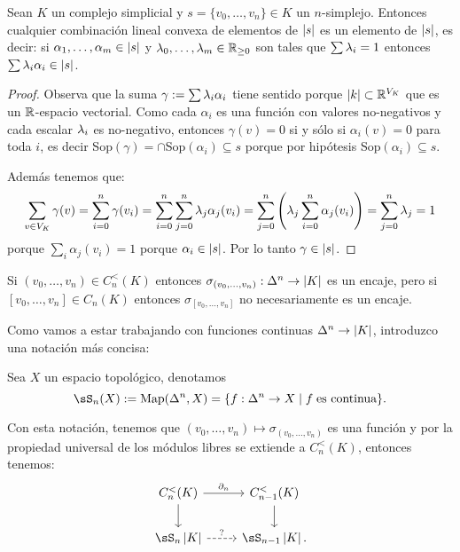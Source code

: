 \documentclass[../../topologia_algebraica]{subfiles}
\begin{document}
\begin{lema}
  Sean $K$ un complejo simplicial y $s=\{v_0,\ldots,v_n\}\in K$ un $n$-simplejo. Entonces cualquier
  combinaci\'on lineal convexa de elementos de $\left| s \right|$ es un elemento de $\left| s \right|$, es decir:
  si $\alpha_1,\ldots,\alpha_m\in\left| s \right|$ y $\lambda_0,\ldots,\lambda_m\in\mathbb{R}_{\geq 0}$ son tales que
  $\sum \lambda_i =1$ entonces $\sum \lambda_i\alpha_i \in\left| s \right|$.
\end{lema}
\begin{proof}
  Observa que la suma $\gamma:=\sum\lambda_i\alpha_i$ tiene sentido porque $\left| k \right|\subset\mathbb{R}^{V_K}$ que es
  un $\mathbb{R}$-espacio vectorial. Como cada $\alpha_i$ es una funci\'on con valores no-negativos y cada
  escalar $\lambda_i$ es no-negativo, entonces $\gamma(v)=0$ si y s\'olo si $\alpha_i(v)=0$ para toda $i$, es
  decir Sop$(\gamma)=\cap$Sop$(\alpha_i)\subseteq s$ porque por hip\'otesis Sop$(\alpha_i)\subseteq s$.
  
  Adem\'as tenemos que:
  \[
    \sum_{v\in V_K}\gamma(v)=
    \sum_{i=0}^n\gamma(v_i)=
    \sum_{i=0}^n\sum_{j=0}^n \lambda_j\alpha_j(v_i)=
    \sum_{j=0}^n\left( \lambda_j \sum_{i=0}^n \alpha_j( v_i) \right)=
    \sum_{j=0}^n \lambda_j =1
  \]
  porque $\sum_i \alpha_j(v_i)=1$ porque $\alpha_i\in\left| s \right|$. Por lo tanto $\gamma\in\left| s \right|$.
\end{proof}

\begin{nota}
  Si $(v_0,\ldots,v_n)\in C_n^<(K)$ entonces $\sigma_{(v_0,\ldots,v_n)}:\Delta^n\rightarrow\left| K \right|$ es un encaje,
  pero si $[v_0,\ldots,v_n]\in C_n(K)$ entonces $\sigma_{[v_0,\ldots,v_n]}$ no necesariamente es un encaje.
\end{nota}

Como vamos a estar trabajando con funciones continuas $\Delta^n\rightarrow\left| K \right|$, introduzco una notaci\'on
m\'as concisa:

\begin{defin}
  Sea $X$ un espacio topol\'ogico, denotamos
  \[
    \sS_n(X):=\text{Map}(\Delta^n,X)=\{f:\Delta^n\ra X\mid f\;\text{es continua}\}.
  \]
\end{defin}

Con esta notaci\'on, tenemos que $(v_0,\ldots,v_n)\mapsto \sigma_{(v_0,\ldots,v_n)}$ es una funci\'on
y por la propiedad universal de los m\'odulos libres se extiende a $C_n^<(K)$, entonces tenemos:
\[
  \begin{tikzcd}
    C_n^<(K) \arrow[d] \arrow[r,"\partial_n"] & C_{n-1}^<(K) \arrow[d] \\
    \sS_n\abs{K} \arrow[r,dashed,"?"] & \sS_{n-1}\abs{K}.
  \end{tikzcd}
\] 
\end{document}
